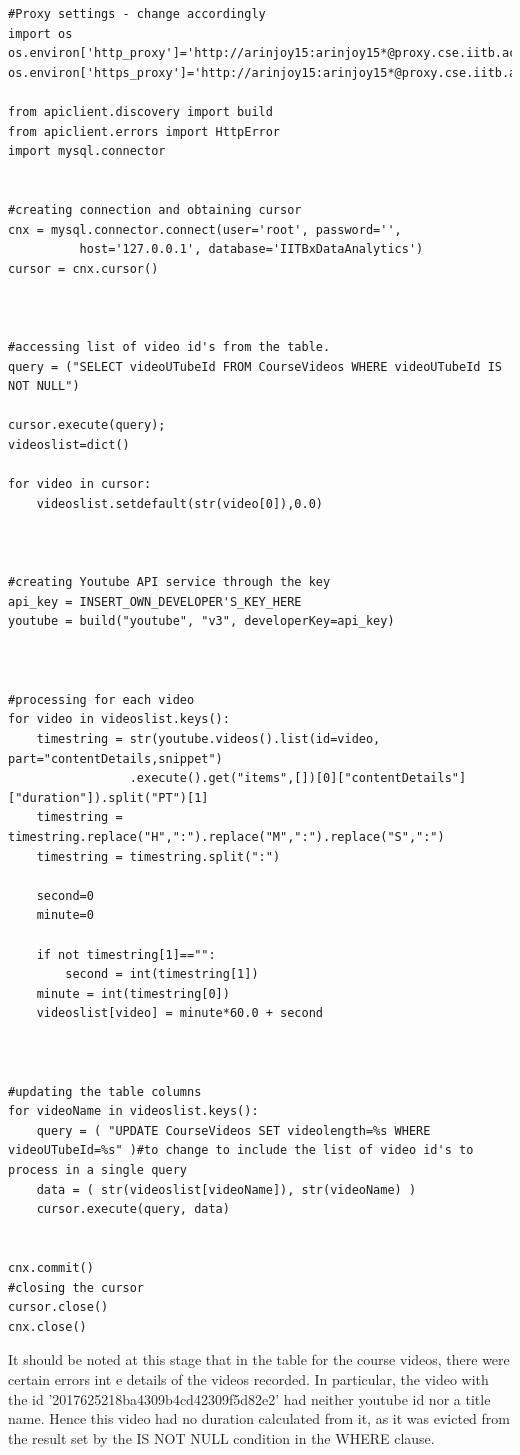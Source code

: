 \documentclass[16pt]{report}
\begin{document}
\begin{verbatim}
#Proxy settings - change accordingly
import os
os.environ['http_proxy']='http://arinjoy15:arinjoy15*@proxy.cse.iitb.ac.in:80'
os.environ['https_proxy']='http://arinjoy15:arinjoy15*@proxy.cse.iitb.ac.in:80'

from apiclient.discovery import build
from apiclient.errors import HttpError
import mysql.connector


#creating connection and obtaining cursor
cnx = mysql.connector.connect(user='root', password='', 
          host='127.0.0.1', database='IITBxDataAnalytics')
cursor = cnx.cursor()



#accessing list of video id's from the table.
query = ("SELECT videoUTubeId FROM CourseVideos WHERE videoUTubeId IS NOT NULL")

cursor.execute(query);
videoslist=dict()

for video in cursor:
	videoslist.setdefault(str(video[0]),0.0)



#creating Youtube API service through the key
api_key = INSERT_OWN_DEVELOPER'S_KEY_HERE
youtube = build("youtube", "v3", developerKey=api_key)



#processing for each video
for video in videoslist.keys():
	timestring = str(youtube.videos().list(id=video, part="contentDetails,snippet")
                 .execute().get("items",[])[0]["contentDetails"]["duration"]).split("PT")[1]
	timestring = timestring.replace("H",":").replace("M",":").replace("S",":")
	timestring = timestring.split(":")
	
	second=0
	minute=0

	if not timestring[1]=="":
		second = int(timestring[1])
	minute = int(timestring[0])
	videoslist[video] = minute*60.0 + second



#updating the table columns
for videoName in videoslist.keys():
	query = ( "UPDATE CourseVideos SET videolength=%s WHERE videoUTubeId=%s" )#to change to include the list of video id's to process in a single query
	data = ( str(videoslist[videoName]), str(videoName) )
	cursor.execute(query, data)


cnx.commit()
#closing the cursor
cursor.close()
cnx.close()	
\end{verbatim}

It should be noted at this stage that in the table for the course videos, there were certain errors int e details of the videos recorded. In particular, the video with the id '2017625218ba4309b4cd42309f5d82e2' had neither youtube id nor a title name. Hence this video had no duration calculated from it, as it was evicted from the result set by the IS NOT NULL condition in the WHERE clause.
\end{document}

